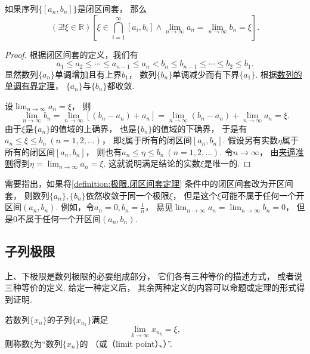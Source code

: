 \begin{theorem}[闭区间套定理]\label{definition:极限.闭区间套定理}
如果序列\(\{[a_n,b_n]\}\)是闭区间套，
那么\[
	(\exists!\xi\in\mathbb{R})
	\left[
		\xi \in \bigcap_{i=1}^\infty [a_i,b_i]
		\land
		\lim_{n\to\infty} a_n = \lim_{n\to\infty} b_n = \xi
	\right].
\]
\begin{proof}
根据闭区间套的定义，我们有\[
	a_1 \leq a_2 \leq \dotsb \leq a_{n-1} \leq a_n
	< b_n \leq b_{n-1} \leq \dotsb \leq b_2 \leq b_1.
\]
显然数列\(\{a_n\}\)单调增加且有上界\(b_1\)，
数列\(\{b_n\}\)单调减少而有下界\(\{a_1\}\).
根据\hyperref[theorem:极限.数列的单调有界定理]{数列的单调有界定理}，
\(\{a_n\}\)与\(\{b_n\}\)都收敛.

设\(\lim_{n\to\infty} a_n = \xi\)，
则\[
	\lim_{n\to\infty} b_n
	= \lim_{n\to\infty} [(b_n - a_n) + a_n]
	= \lim_{n\to\infty} (b_n - a_n) + \lim_{n\to\infty} a_n
	= \xi.
\]
由于\(\xi\)是\(\{a_n\}\)的值域的上确界，
也是\(\{b_n\}\)的值域的下确界，
于是有\(a_n \leq \xi \leq b_n\ (n=1,2,\dotsc)\)，
即\(\xi\)属于所有的闭区间\([a_n,b_n]\).
假设另有实数\(\eta\)属于所有的闭区间\([a_n,b_n]\)，
则也有\(a_n \leq \eta \leq b_n\ (n=1,2,\dotsc)\).
令\(n\to\infty\)，
由\hyperref[theorem:数列极限.夹逼准则]{夹逼准则}得到\(\eta=\lim_{n\to\infty} a_n=\xi\).
这就说明满足结论的实数\(\xi\)是唯一的.
\end{proof}
\end{theorem}

需要指出，如果将\cref{definition:极限.闭区间套定理} 条件中的闭区间套改为开区间套，
则数列\(\{a_n\},\{b_n\}\)依然收敛于同一个极限\(\xi\)，
但是这个\(\xi\)可能不属于任何一个开区间\((a_n,b_n)\).
例如，令\(a_n = 0, b_n = \frac1n\)，
易见\(\lim_{n\to\infty} a_n = \lim_{n\to\infty} b_n = 0\)，
但是\(0\)不属于任何一个开区间\((a_n,b_n)\).

\subsection{子列极限}
上、下极限是数列极限的必要组成部分，
它们各有三种等价的描述方式，
或者说三种等价的定义.
给定一种定义后，
其余两种定义的内容可以命题或定理的形式得到证明.

\begin{definition}
若数列\(\{x_n\}\)的子列\(\{x_{n_k}\}\)满足\[
	\lim_{k\to\infty} x_{n_k} = \xi,
\]
则称数\(\xi\)为“数列\(\{x_n\}\)的%
（或（limit point）、）”.
\end{definition}

